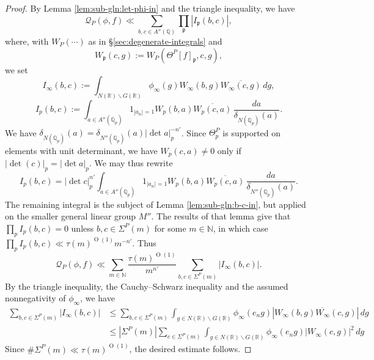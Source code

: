 \documentclass[reqno]{amsart}
\def\O{\operatorname{O}}
\theoremstyle{plain} \newtheorem{theorem} {Theorem}
\theoremstyle{definition} \newtheorem{definition} [theorem] {Definition}
\theoremstyle{itplain} %
\numberwithin{equation}{section}
\numberwithin{theorem}{section}
\renewcommand{\leq}{\leqslant}
\begin{document}
\begin{proof}
  By Lemma \ref{lem:sub-gln:let-phi-in} and the triangle inequality, we have
\begin{equation*}
  \mathcal{Q}_P(\phi,f)
  \ll
  \sum_{b,c \in A''(\mathbb{Q})}
  \prod_\mathfrak{p}
  \left\lvert
    I_\mathfrak{p}(b,c)
  \right\rvert,
\end{equation*}
where, with $W_P(\dotsb)$ as in \S\ref{sec:degenerate-integrals} and
\begin{equation*}
  W_\mathfrak{p}(c,g) :=
  W_P(\Theta^P[f]_\mathfrak{p}, c, g),
\end{equation*}
we set
\begin{equation*}
  I_\infty(b,c) := \int _{N(\mathbb{R}) \backslash G(\mathbb{R}) } \phi_\infty(g) W_\infty(b,g) \overline{W_\infty(c,g)} \, d g,
\end{equation*}
\begin{equation*}
  I_p(b,c) := \int _{a \in A''(\mathbb{Q}_p)}
  1_{|a_n| = 1}
  W_p(b,a)
  \overline{W_p(c,a)}
  \, \frac{d a}{\delta_{N(\mathbb{Q}_p)}(a)}.
\end{equation*}
We have $\delta_{N(\mathbb{Q}_p)}(a) = \delta_{N''(\mathbb{Q}_p)}(a) |\det a|_p^{-n'}$.  Since $\Theta^P_p$ is supported on elements with unit determinant, we have $W_p(c,a) \neq 0$ only if $|\det(c)|_p = |\det a|_p$.  We may thus rewrite
\begin{equation*}
  I_p(b,c) =
  |\det c|_p^{n'}
  \int _{a \in A''(\mathbb{Q}_p)}
  1_{|a_n| = 1}
  W_p(b,a)
  \overline{W_p(c,a)}
  \, \frac{d a}{\delta_{N''(\mathbb{Q}_p)}(a)}.
\end{equation*}
The remaining integral is the subject of Lemma \ref{lem:sub-gln:b-c-in}, but applied on the smaller general linear group $M''$.  The results of that lemma give that $\prod_p I_p(b,c) = 0$ unless $b,c \in \Sigma^P(m)$ for some $m \in \mathbb{N}$, in which case $\prod_p I_p(b,c) \ll \tau(m)^{\O(1)} m^{-n'}$.  Thus
\begin{equation*}
  \mathcal{Q}_P(\phi,f)
  \ll
  \sum _{m \in \mathbb{N} }
  \frac{\tau(m)^{\O(1)}}{m^{n'}}
  \sum_{b,c \in \Sigma^P(m)} |I_\infty(b,c)|.
\end{equation*}
By the triangle inequality, the Cauchy--Schwarz inequality and the assumed nonnegativity of $\phi_\infty$, we have
\begin{align*}
  \sum _{b,c \in \Sigma^P(m)}
  |I_\infty(b,c)|
  &\leq
  \sum _{b, c \in \Sigma^P(m)}
    \int _{g \in N(\mathbb{R}) \backslash G(\mathbb{R})}
    \phi_\infty(e_n g) 
  |W_\infty(b,g) \overline{W_\infty}(c,g)|
    \, d g
    \\
  &\leq
    |\Sigma^P(m)|
    \sum _{ c \in \Sigma^P(m)}
    \int _{g \in N(\mathbb{R}) \backslash G(\mathbb{R})}
    \phi_\infty(e_n g) 
    |W_\infty(c,g)|^2
    \, d g
\end{align*}
Since $\# \Sigma^P(m) \ll \tau(m)^{\O(1)}$, the desired estimate follows.
\end{proof}
\end{document}
